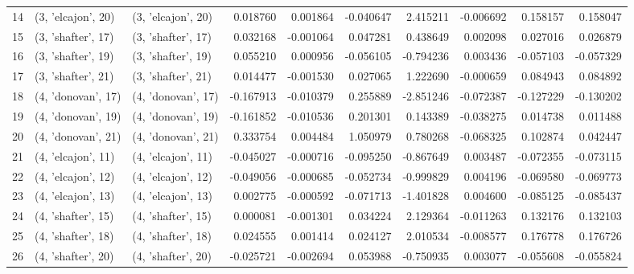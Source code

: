 \begin{tabular}{lllrrrrrrr}
14 &  (3, 'elcajon', 20) &  (3, 'elcajon', 20) &  0.018760 &  0.001864 & -0.040647 &  2.415211 & -0.006692 &  0.158157 &  0.158047 \\
15 &  (3, 'shafter', 17) &  (3, 'shafter', 17) &  0.032168 & -0.001064 &  0.047281 &  0.438649 &  0.002098 &  0.027016 &  0.026879 \\
16 &  (3, 'shafter', 19) &  (3, 'shafter', 19) &  0.055210 &  0.000956 & -0.056105 & -0.794236 &  0.003436 & -0.057103 & -0.057329 \\
17 &  (3, 'shafter', 21) &  (3, 'shafter', 21) &  0.014477 & -0.001530 &  0.027065 &  1.222690 & -0.000659 &  0.084943 &  0.084892 \\
18 &  (4, 'donovan', 17) &  (4, 'donovan', 17) & -0.167913 & -0.010379 &  0.255889 & -2.851246 & -0.072387 & -0.127229 & -0.130202 \\
19 &  (4, 'donovan', 19) &  (4, 'donovan', 19) & -0.161852 & -0.010536 &  0.201301 &  0.143389 & -0.038275 &  0.014738 &  0.011488 \\
20 &  (4, 'donovan', 21) &  (4, 'donovan', 21) &  0.333754 &  0.004484 &  1.050979 &  0.780268 & -0.068325 &  0.102874 &  0.042447 \\
21 &  (4, 'elcajon', 11) &  (4, 'elcajon', 11) & -0.045027 & -0.000716 & -0.095250 & -0.867649 &  0.003487 & -0.072355 & -0.073115 \\
22 &  (4, 'elcajon', 12) &  (4, 'elcajon', 12) & -0.049056 & -0.000685 & -0.052734 & -0.999829 &  0.004196 & -0.069580 & -0.069773 \\
23 &  (4, 'elcajon', 13) &  (4, 'elcajon', 13) &  0.002775 & -0.000592 & -0.071713 & -1.401828 &  0.004600 & -0.085125 & -0.085437 \\
24 &  (4, 'shafter', 15) &  (4, 'shafter', 15) &  0.000081 & -0.001301 &  0.034224 &  2.129364 & -0.011263 &  0.132176 &  0.132103 \\
25 &  (4, 'shafter', 18) &  (4, 'shafter', 18) &  0.024555 &  0.001414 &  0.024127 &  2.010534 & -0.008577 &  0.176778 &  0.176726 \\
26 &  (4, 'shafter', 20) &  (4, 'shafter', 20) & -0.025721 & -0.002694 &  0.053988 & -0.750935 &  0.003077 & -0.055608 & -0.055824 \\
\bottomrule
\end{tabular}
